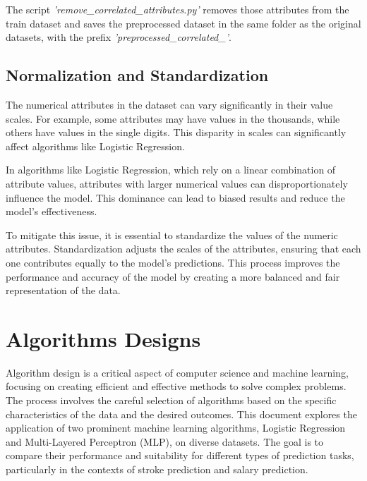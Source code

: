 \documentclass[runningheads]{paper}
\begin{document}
The script \textit{'remove\_correlated\_attributes.py'}
removes those attributes from the train dataset and saves the preprocessed dataset
in the same folder as the original datasets, with the prefix \textit{'preprocessed\_correlated\_'}.

\subsection{Normalization and Standardization}
The numerical attributes in the dataset can vary significantly in their value scales. For example, 
some attributes may have values in the thousands, while others have values in the single digits. 
This disparity in scales can significantly affect algorithms like Logistic Regression.

In algorithms like Logistic Regression, which rely on a linear combination of attribute values,
attributes with larger numerical values can disproportionately influence the model. This dominance 
can lead to biased results and reduce the model's effectiveness.

To mitigate this issue, it is essential to standardize the values of the numeric attributes. 
Standardization adjusts the scales of the attributes, ensuring that each one contributes equally 
to the model's predictions. This process improves the performance and accuracy of the model by 
creating a more balanced and fair representation of the data.

\section{Algorithms Designs}
Algorithm design is a critical aspect of computer science and machine learning, 
focusing on creating efficient and effective methods to solve complex problems. 
The process involves the careful selection of algorithms based on the specific 
characteristics of the data and the desired outcomes. This document explores the 
application of two prominent machine learning algorithms, Logistic Regression and 
Multi-Layered Perceptron (MLP), on diverse datasets. The goal is to compare their 
performance and suitability for different types of prediction tasks, particularly 
in the contexts of stroke prediction and salary prediction.
\end{document}
